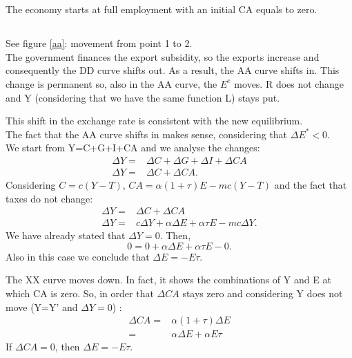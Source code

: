 \documentclass[	11pt, ]{fphw}
\begin{document}
\section{}
The economy starts at full employment with an initial CA equals to zero. 
\subsection{}
See figure \vref{aa}: movement from point 1 to 2. \\
The government finances the export subsidity, so the exports increase and consequently the DD curve shifts out. As a result, the AA curve shifts in. This change is permanent so, also in the AA curve, the $E^{e}$ moves. R does not change and Y (considering that we have the same function L) stays put.   \par
This shift in the exchange rate is consistent with the new equilibrium.\\ The fact that the AA curve shifts in makes sense, considering that $\Delta E^{*}<0$. \\We start from Y=C+G+I+CA and we analyse the changes:
\begin{align}
    \Delta Y=&\Delta C+\Delta  G+\Delta I+\Delta CA \\
    \Delta Y=&\Delta C+\Delta CA . 
\end{align}
Considering $C=c(Y-T)$, $CA=\alpha(1+\tau)E-mc(Y-T)$ and the fact that taxes do not change:
\begin{align}
    \Delta Y=&\Delta C+\Delta CA   \\
    \Delta Y=&c \Delta Y+\alpha\Delta E+\alpha \tau E-mc\Delta Y.
\end{align}
We have already stated that $\Delta Y =0$. Then,
\[0=0+\alpha\Delta E+\alpha \tau E-0.\]
Also in this case we conclude that $\Delta E=-E\tau$. 
\par The XX curve moves down. In fact, it shows the combinations of Y and E at which CA is zero. So, in order that $\Delta CA$ stays zero and considering Y does not move (Y=Y' and $\Delta Y=0$) :
\begin{align}
    \Delta CA =& \alpha (1+ \tau )\Delta E  \\
    =& \alpha \Delta E + \alpha E \tau 
\end{align}
If $\Delta CA=0$, then $\Delta E=-E\tau$.
\end{document}

